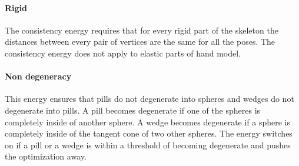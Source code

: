 \paragraph{Rigid}
The consistency energy requires that for every rigid part of the skeleton the distances between every pair of vertices are the same for all the poses. The consistency energy does not apply to elastic parts of hand model.

\paragraph{Non degeneracy}
This energy ensures that pills do not degenerate into spheres and wedges do not degenerate into pills.
A pill becomes degenerate if one of the spheres is completely inside of another sphere. A wedge becomes degenerate if a sphere is completely inside of the tangent cone of two other spheres. The energy switches on if a pill or a wedge is within a threshold of becoming degenerate and pushes the optimization away.


\newpage

